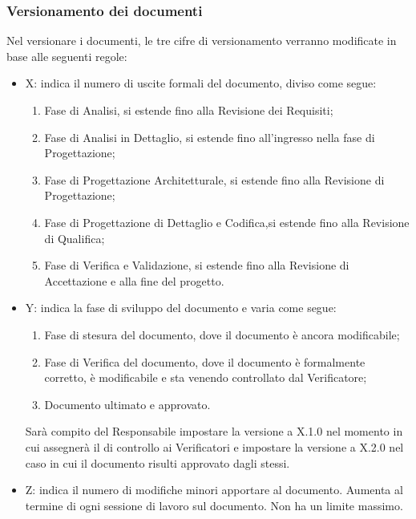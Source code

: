 \subsubsection{Versionamento dei documenti}
\label{6.3}
Nel versionare i documenti, le tre cifre di versionamento verranno modificate in base alle seguenti regole:
\begin{itemize}
\item X: indica il numero di uscite formali del documento, diviso come segue:
\begin{enumerate}
\item Fase di Analisi, si estende fino alla Revisione dei Requisiti;
\item Fase di Analisi in Dettaglio, si estende fino all'ingresso nella fase di Progettazione;
\item Fase di Progettazione Architetturale, si estende fino alla Revisione di Progettazione;
\item Fase di Progettazione di Dettaglio e Codifica,si estende fino alla Revisione di Qualifica;
\item Fase di Verifica e Validazione, si estende fino alla Revisione di Accettazione e alla fine del progetto.
\end{enumerate}
\item Y: indica la fase di sviluppo del documento e varia come segue:
\begin{enumerate}[start=0]
\item Fase di stesura del documento, dove il documento è ancora modificabile;
\item Fase di Verifica del documento, dove il documento è formalmente corretto, è modificabile e sta venendo controllato dal Verificatore;
\item Documento ultimato e approvato.
\end{enumerate}
Sarà compito del Responsabile impostare la versione a X.1.0 nel momento in cui assegnerà il  di controllo ai Verificatori e impostare la versione a X.2.0 nel caso in cui il documento risulti approvato dagli stessi.
\item Z: indica il numero di modifiche minori apportare al documento. Aumenta al termine di ogni sessione di lavoro sul documento. Non ha un limite massimo.
\end{itemize}

